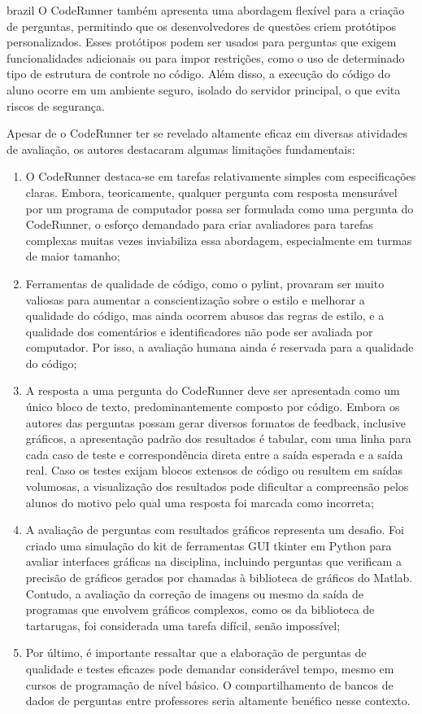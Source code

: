 \begin{otherlanguage*}{brazil}
O CodeRunner também apresenta uma abordagem flexível para a criação de perguntas, permitindo que os desenvolvedores de questões criem protótipos personalizados. Esses protótipos podem ser usados para perguntas que exigem funcionalidades adicionais ou para impor restrições, como o uso de determinado tipo de estrutura de controle no código. Além disso, a execução do código do aluno ocorre em um ambiente seguro, isolado do servidor principal, o que evita riscos de segurança.

Apesar de o CodeRunner ter se revelado altamente eficaz em diversas atividades de avaliação, os autores destacaram algumas limitações fundamentais:

\begin{enumerate} [label=(\alph*)]
    \item O CodeRunner destaca-se em tarefas relativamente simples com especificações claras. Embora, teoricamente, qualquer pergunta com resposta mensurável por um programa de computador possa ser formulada como uma pergunta do CodeRunner, o esforço demandado para criar avaliadores para tarefas complexas muitas vezes inviabiliza essa abordagem, especialmente em turmas de maior tamanho;
    \item Ferramentas de qualidade de código, como o pylint, provaram ser muito valiosas para aumentar a conscientização sobre o estilo e melhorar a qualidade do código, mas ainda ocorrem abusos das regras de estilo, e a qualidade dos comentários e identificadores não pode ser avaliada por computador. Por isso, a avaliação humana ainda é reservada para a qualidade do código;
    \item A resposta a uma pergunta do CodeRunner deve ser apresentada como um único bloco de texto, predominantemente composto por código. Embora os autores das perguntas possam gerar diversos formatos de feedback, inclusive gráficos, a apresentação padrão dos resultados é tabular, com uma linha para cada caso de teste e correspondência direta entre a saída esperada e a saída real. Caso os testes exijam blocos extensos de código ou resultem em saídas volumosas, a visualização dos resultados pode dificultar a compreensão pelos alunos do motivo pelo qual uma resposta foi marcada como incorreta;
    \item A avaliação de perguntas com resultados gráficos representa um desafio. Foi criado uma simulação do kit de ferramentas GUI tkinter em Python para avaliar interfaces gráficas na disciplina, incluindo perguntas que verificam a precisão de gráficos gerados por chamadas à biblioteca de gráficos do Matlab. Contudo, a avaliação da correção de imagens ou mesmo da saída de programas que envolvem gráficos complexos, como os da biblioteca de tartarugas, foi considerada uma tarefa difícil, senão impossível;
    \item Por último, é importante ressaltar que a elaboração de perguntas de qualidade e testes eficazes pode demandar considerável tempo, mesmo em cursos de programação de nível básico. O compartilhamento de bancos de dados de perguntas entre professores seria altamente benéfico nesse contexto.
\end{enumerate}



\end{otherlanguage*}
